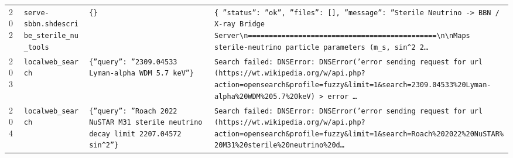\documentclass[11pt,a4paper]{article}
\begin{document}
\begin{longtable}{@{}p{}p{}p{}p{}@{}}
202 & \texttt{serve-sbbn.sh}\newline\texttt{describe\_\allowbreak{}sterile\_\allowbreak{}nu\_\allowbreak{}tools} & \texttt{\{\}\allowbreak{}} & \texttt{\{   ''status'':\allowbreak{} ''ok'',\allowbreak{}   ''files'':\allowbreak{} []\allowbreak{},\allowbreak{}   ''message'':\allowbreak{} ''Sterile Neutrino -\textgreater{}\allowbreak{} BBN /\allowbreak{} X-ray Bridge Server\textbackslash{}\allowbreak{}n=\allowbreak{}=\allowbreak{}=\allowbreak{}=\allowbreak{}=\allowbreak{}=\allowbreak{}=\allowbreak{}=\allowbreak{}=\allowbreak{}=\allowbreak{}=\allowbreak{}=\allowbreak{}=\allowbreak{}=\allowbreak{}=\allowbreak{}=\allowbreak{}=\allowbreak{}=\allowbreak{}=\allowbreak{}=\allowbreak{}=\allowbreak{}=\allowbreak{}=\allowbreak{}=\allowbreak{}=\allowbreak{}=\allowbreak{}=\allowbreak{}=\allowbreak{}=\allowbreak{}=\allowbreak{}=\allowbreak{}=\allowbreak{}=\allowbreak{}=\allowbreak{}=\allowbreak{}=\allowbreak{}=\allowbreak{}=\allowbreak{}=\allowbreak{}=\allowbreak{}=\allowbreak{}=\allowbreak{}=\allowbreak{}=\allowbreak{}=\allowbreak{}\textbackslash{}\allowbreak{}n\textbackslash{}\allowbreak{}nMaps sterile-neutrino particle parameters (m\_\allowbreak{}s,\allowbreak{} sin\textasciicircum{}\allowbreak{}2 2\ldots{}\allowbreak{}} \\
203 & \texttt{local}\newline\texttt{web\_\allowbreak{}search} & \texttt{\{''query'':\allowbreak{} ''2309.04533 Lyman-alpha WDM 5.7 keV''\}\allowbreak{}} & \texttt{Search failed:\allowbreak{} DNSError:\allowbreak{} DNSError('error sending request for url (https:\allowbreak{}/\allowbreak{}/\allowbreak{}wt.wikipedia.org/\allowbreak{}w/\allowbreak{}api.php?action=\allowbreak{}opensearch\&profile=\allowbreak{}fuzzy\&limit=\allowbreak{}1\&search=\allowbreak{}2309.04533\%20Lyman-alpha\%20WDM\%205.7\%20keV)\allowbreak{} \textgreater{}\allowbreak{} error \ldots{}\allowbreak{}} \\
204 & \texttt{local}\newline\texttt{web\_\allowbreak{}search} & \texttt{\{''query'':\allowbreak{} ''Roach 2022 NuSTAR M31 sterile neutrino decay limit 2207.04572 sin\textasciicircum{}\allowbreak{}2''\}\allowbreak{}} & \texttt{Search failed:\allowbreak{} DNSError:\allowbreak{} DNSError('error sending request for url (https:\allowbreak{}/\allowbreak{}/\allowbreak{}wt.wikipedia.org/\allowbreak{}w/\allowbreak{}api.php?action=\allowbreak{}opensearch\&profile=\allowbreak{}fuzzy\&limit=\allowbreak{}1\&search=\allowbreak{}Roach\%202022\%20NuSTAR\%20M31\%20sterile\%20neutrino\%20d\ldots{}\allowbreak{}} \\

\end{longtable}
\end{document}
